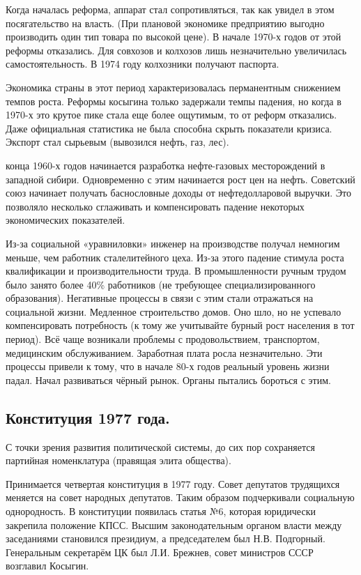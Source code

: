 Когда началась реформа, аппарат стал сопротивляться, так как увидел в этом посягательство на власть. (При плановой экономике предприятию выгодно производить один тип товара по высокой цене). В начале 1970-х годов от этой реформы отказались. Для совхозов и колхозов лишь незначительно увеличилась самостоятельность. В 1974 году колхозники получают паспорта.

Экономика страны в этот период характеризовалась перманентным снижением темпов роста. Реформы косыгина только задержали темпы падения, но когда в 1970-х это крутое пике стала еще более ощутимым, то от реформ отказались. Даже официальная статистика не была способна скрыть показатели кризиса. Экспорт стал сырьевым (вывозился нефть, газ, лес). 

 конца 1960-х годов начинается разработка нефте-газовых месторождений в западной сибири. Одновременно с этим начинается рост цен на нефть. Советский союз начинает получать баснословные доходы от нефтедолларовой выручки. Это позволяло несколько сглаживать и компенсировать падение некоторых экономических показателей.

 Из-за социальной «уравниловки» инженер на производстве получал немногим меньше, чем работник сталелитейного цеха. Из-за этого падение стимула роста квалификации и производительности труда. В промышленности ручным трудом было занято более 40\% работников (не требующее специализированного образования). Негативные процессы в связи с этим стали отражаться на социальной жизни. Медленное строительство домов. Оно шло, но не успевало компенсировать потребность (к тому же учитывайте бурный рост населения в тот период). Всё чаще возникали проблемы с продовольствием, транспортом, медицинским обслуживанием. Заработная плата росла незначительно. Эти процессы привели к тому, что в начале 80-х годов реальный уровень жизни падал. Начал развиваться чёрный рынок. Органы пытались бороться с этим. 


\subsection{Конституция 1977 года.}

С точки зрения развития политической системы, до сих пор сохраняется партийная номенклатура (правящая элита общества). 

Принимается четвертая конституция в 1977 году. Совет депутатов трудящихся меняется на совет народных депутатов. Таким образом подчеркивали социальную однородность. В конституции появилась статья №6, которая юридически закрепила положение КПСС. Высшим законодательным органом власти между заседаниями становился президиум, а председателем был Н.В. Подгорный. Генеральным секретарём ЦК был Л.И. Брежнев, совет министров СССР возглавил Косыгин.


